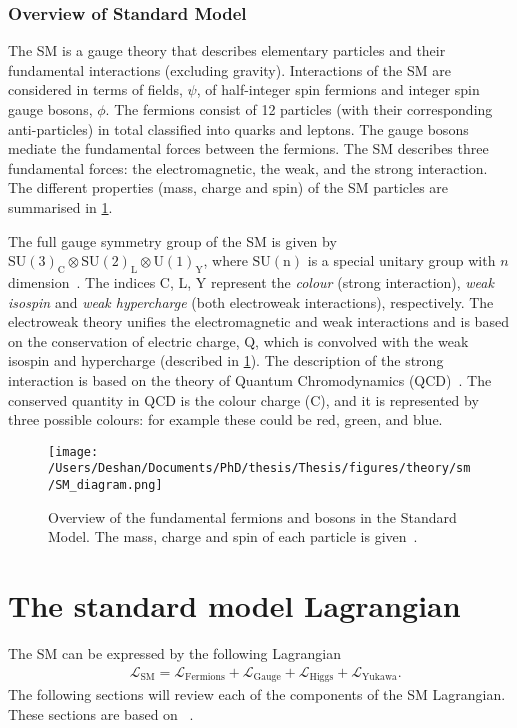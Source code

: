 \subsubsection{Overview of Standard Model}\label{sec:SM:intro}
The SM is a gauge theory that describes elementary particles and their fundamental interactions (excluding gravity). Interactions of the SM are considered in terms of fields, $\psi$, of half-integer spin fermions and integer spin gauge bosons, $\phi$. The fermions consist of 12 particles (with their corresponding anti-particles) in total classified into quarks and leptons. The gauge bosons mediate the fundamental forces between the fermions. The SM describes three fundamental forces: the electromagnetic, the weak, and the strong interaction. The different properties (mass, charge and spin) of the SM particles are summarised in \cref{fig:sm_diagram}. 

The full gauge symmetry group of the SM is given by $\mathrm{SU(3)}_\mathrm{C} \otimes \mathrm{SU(2)}_\mathrm{L} \otimes \mathrm{U(1)}_\mathrm{Y}$, where $\mathrm{SU(n)}$ is a special unitary group with $n$ dimension~\cite{stephanhaywood}. The indices C, L, Y represent the \emph{colour} (strong interaction), \emph{weak isospin} and \emph{weak hypercharge} (both electroweak interactions), respectively. The electroweak theory unifies the electromagnetic and weak interactions and is based on the conservation of electric charge, Q, which is convolved with the weak isospin and hypercharge (described in \cref{sec:SM:lagrangian}). The description of the strong interaction is based on the theory of Quantum Chromodynamics (QCD)~\cite{Zweig:1964jf}. The conserved quantity in QCD is the colour charge (C), and it is represented by three possible colours: for example these could be red, green, and blue. 

\begin{figure}[!htpb]
    \centering
    \texttt{[image: /Users/Deshan/Documents/PhD/thesis/Thesis/figures/theory/sm/SM\_diagram.png]}
    \caption{Overview of the fundamental fermions and bosons in the Standard Model. The mass, charge and spin of each particle is given~\cite{wiki:xxx}.}
    \label{fig:sm_diagram}
\end{figure}

\section{The standard model Lagrangian}\label{sec:SM:lagrangian}
The SM can be expressed by the following Lagrangian
\begin{equation}
    \label{eq:lagrangianSM}
    \begin{aligned}
        & \mathcal{L}_\mathrm{SM} = \mathcal{L}_\mathrm{Fermions} + \mathcal{L}_\mathrm{Gauge} + \mathcal{L}_\mathrm{Higgs} + \mathcal{L}_\mathrm{Yukawa}.
    \end{aligned}
\end{equation}
The following sections will review each of the components of the SM Lagrangian. These sections are based on ~\cite{Thomson:2013zua,Peskin:1995ev}.

